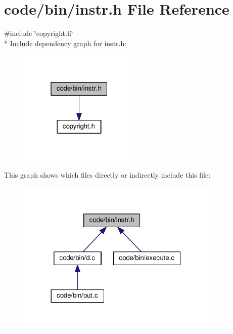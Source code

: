 \section{code/bin/instr.h File Reference}
\label{instr_8h}
{\ttfamily \#include \char`\"{}copyright.\+h\char`\"{}}\\*
Include dependency graph for instr.\+h\+:
\nopagebreak
\begin{figure}[H]
\begin{center}
\leavevmode
\includegraphics[width=163pt]{instr_8h__incl}
\end{center}
\end{figure}
This graph shows which files directly or indirectly include this file\+:
\nopagebreak
\begin{figure}[H]
\begin{center}
\leavevmode
\includegraphics[width=272pt]{instr_8h__dep__incl}
\end{center}
\end{figure}
